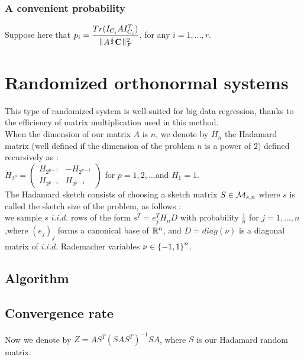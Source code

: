  \subsection{A convenient probability}
 
 Suppose here that $\dsp p_{i} = \frac{Tr( I_{C_{i}} A I_{C_{i}}^{T} ) }{\norm{A^{\frac12}\bold{C}}^{2}_{F} }$, for any $i = 1,\dots,r.$\\

 

\chapter{Randomized orthonormal systems}

This type of randomized system is well-suited for big data regression, thanks to the efficiency of matrix multiplication used in this method.\\
When the dimension of our matrix $A$ is $n$, we denote by $H_{n}$ the Hadamard matrix (well defined if the dimension of the problem $n$ is a power of $2$) defined recursively as :\\

$H_{2^{p}} = \begin{pmatrix} H_{2^{p-1}} & - H_{2^{p-1}} \\
					H_{2^{p-1}} & H_{2^{p-1}}  \end{pmatrix} $ for $p=1,2,\dots$and $H_{1} = 1.$\\

The Hadamard sketch consists of choosing a sketch matrix $S \in {\mathcal M}_{s,n}$ where $s$ is called the sketch size of the problem, as follows :\\ 
we sample $s$ $i.i.d.$ rows of the form $s^{T} = e_{j}^{T}H_{n} D $ with probability $\frac 1n$ for $j = 1,\dots,n$,where $(e_{j})_{j}$ forms a canonical base of ${\mathbb R}^{n}$, and $D = diag(\nu)$ is a diagonal matrix of $i.i.d.$ Rademacher variables $\nu \in \left\{-1,1\right\}^{n}$.  


\section{Algorithm}


\section{Convergence rate}



Now we denote by $Z = A S^{T} (S A S^{T})^{-1} S A$, where $S$ is our Hadamard random matrix.\\

